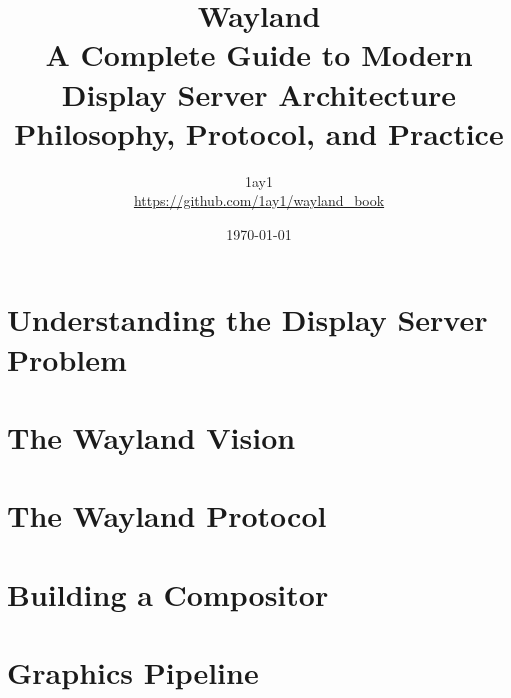 \documentclass[11pt,twoside,openright]{book}
\title{
    {\Huge\bfseries Wayland}\\[0.5em]
    {\Large A Complete Guide to Modern Display Server Architecture}\\[1em]
    {\large Philosophy, Protocol, and Practice}
}
\author{1ay1\\
        \small\url{https://github.com/1ay1/wayland_book}}
\date{\today}
\theoremstyle{definition}
\begin{document}
\frontmatter





\tableofcontents
\listoffigures
\listoftables


\mainmatter

\part{Understanding the Display Server Problem}
\label{part:problem-space}




\part{The Wayland Vision}
\label{part:philosophy}





\part{The Wayland Protocol}
\label{part:protocol}







\part{Building a Compositor}
\label{part:compositor}






\part{Graphics Pipeline}
\label{part:graphics}





\end{document}
